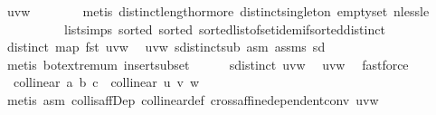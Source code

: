 \begin{isabellebody}
\ uvw\isanewline
\ \ \ \ \ \ \isamarkupfalse%
\ {\isacharparenleft}{\kern0pt}metis\ distinct{\isacharunderscore}{\kern0pt}length{\isacharunderscore}{\kern0pt}{}{\isacharunderscore}{\kern0pt}or{\isacharunderscore}{\kern0pt}more\ distinct{\isacharunderscore}{\kern0pt}singleton\ empty{\isacharunderscore}{\kern0pt}set\ nless{\isacharunderscore}{\kern0pt}le\isanewline
\ \ \ \ \ \ \ \ \ \ list{\isachardot}{\kern0pt}simps{\isacharparenleft}{\kern0pt}{}{}{\isacharparenright}{\kern0pt}\ sorted{}\ sorted{}\ sorted{\isacharunderscore}{\kern0pt}list{\isacharunderscore}{\kern0pt}of{\isacharunderscore}{\kern0pt}set{\isachardot}{\kern0pt}idem{\isacharunderscore}{\kern0pt}if{\isacharunderscore}{\kern0pt}sorted{\isacharunderscore}{\kern0pt}distinct{\isacharparenright}{\kern0pt}\isanewline
\ \ \ \ \isamarkupfalse%
\ {}{\isacharcolon}{\kern0pt}{\isachardoublequoteopen}distinct\ {\isacharparenleft}{\kern0pt}map\ fst\ {\isacharbrackleft}{\kern0pt}u{\isacharcomma}{\kern0pt}v{\isacharcomma}{\kern0pt}w{\isacharbrackright}{\kern0pt}{\isacharparenright}{\kern0pt}{\isachardoublequoteclose}\ \isamarkupfalse%
\ uvw\ sdistinct{\isacharunderscore}{\kern0pt}sub\ asm{\isacharparenleft}{\kern0pt}{}{\isacharcomma}{\kern0pt}{}{\isacharcomma}{\kern0pt}{}{\isacharparenright}{\kern0pt}\ assms{\isacharparenleft}{\kern0pt}{}{\isacharparenright}{\kern0pt}\ sd\isanewline
\ \ \ \ \ \ \isamarkupfalse%
\ {\isacharparenleft}{\kern0pt}metis\ bot{\isachardot}{\kern0pt}extremum\ insert{\isacharunderscore}{\kern0pt}subset{\isacharparenright}{\kern0pt}\isanewline
\ \ \ \ \isamarkupfalse%
\ {}{\isacharcolon}{\kern0pt}{\isachardoublequoteopen}sdistinct\ {\isacharbrackleft}{\kern0pt}u{\isacharcomma}{\kern0pt}v{\isacharcomma}{\kern0pt}w{\isacharbrackright}{\kern0pt}{\isachardoublequoteclose}\ \isamarkupfalse%
\ uvw{\isacharparenleft}{\kern0pt}{}{\isacharcomma}{\kern0pt}{}{\isacharparenright}{\kern0pt}\ \isamarkupfalse%
\ fastforce\isanewline
\isanewline
\ \ \ \ \isamarkupfalse%
\ {}{\isacharcolon}{\kern0pt}\ {\isachardoublequoteopen}collinear{}\ a\ b\ c\ {\isacharequal}{\kern0pt}\ collinear{}\ u\ v\ w{\isachardoublequoteclose}\isanewline
\ \ \ \ \ \ \isamarkupfalse%
\ {\isacharparenleft}{\kern0pt}metis\ asm{\isacharparenleft}{\kern0pt}{}{\isacharcomma}{\kern0pt}{}{\isacharparenright}{\kern0pt}\ coll{\isacharunderscore}{\kern0pt}is{\isacharunderscore}{\kern0pt}affDep\ collinear{}{\isacharunderscore}{\kern0pt}def\ cross{\isacharunderscore}{\kern0pt}affine{\isacharunderscore}{\kern0pt}dependent{\isacharunderscore}{\kern0pt}conv\ uvw{\isacharparenleft}{\kern0pt}{}{\isacharparenright}{\kern0pt}{\isacharparenright}{\kern0pt}\isanewline

\end{isabellebody}
